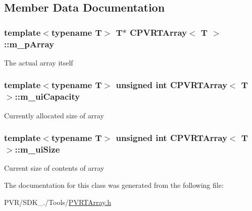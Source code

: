 \subsection{Member Data Documentation}
\hypertarget{class_c_p_v_r_t_array_a84fc25c9ea9aa750c18169240e96427b}{
\subsubsection[{m\+\_\+p\+Array}]{\setlength{\rightskip}{0pt plus 5cm}template$<$typename T$>$ T$\ast$ {\bf C\+P\+V\+R\+T\+Array}$<$ T $>$\+::m\+\_\+p\+Array\hspace{0.3cm}{\ttfamily [protected]}}}\label{class_c_p_v_r_t_array_a84fc25c9ea9aa750c18169240e96427b}
The actual array itself \hypertarget{class_c_p_v_r_t_array_afb47b1c6e7c3ff459af7177fedfe8cb6}{
\subsubsection[{m\+\_\+ui\+Capacity}]{\setlength{\rightskip}{0pt plus 5cm}template$<$typename T$>$ unsigned int {\bf C\+P\+V\+R\+T\+Array}$<$ T $>$\+::m\+\_\+ui\+Capacity\hspace{0.3cm}{\ttfamily [protected]}}}\label{class_c_p_v_r_t_array_afb47b1c6e7c3ff459af7177fedfe8cb6}
Currently allocated size of array \hypertarget{class_c_p_v_r_t_array_a89038c7d7f01037c1b8c2ad18821e217}{
\subsubsection[{m\+\_\+ui\+Size}]{\setlength{\rightskip}{0pt plus 5cm}template$<$typename T$>$ unsigned int {\bf C\+P\+V\+R\+T\+Array}$<$ T $>$\+::m\+\_\+ui\+Size\hspace{0.3cm}{\ttfamily [protected]}}}\label{class_c_p_v_r_t_array_a89038c7d7f01037c1b8c2ad18821e217}
Current size of contents of array 

The documentation for this class was generated from the following file\+:\begin{DoxyCompactItemize}
\item 
P\+V\+R/\+S\+D\+K\+\_./\+Tools/\hyperlink{_p_v_r_t_array_8h}{P\+V\+R\+T\+Array.\+h}\end{DoxyCompactItemize}
